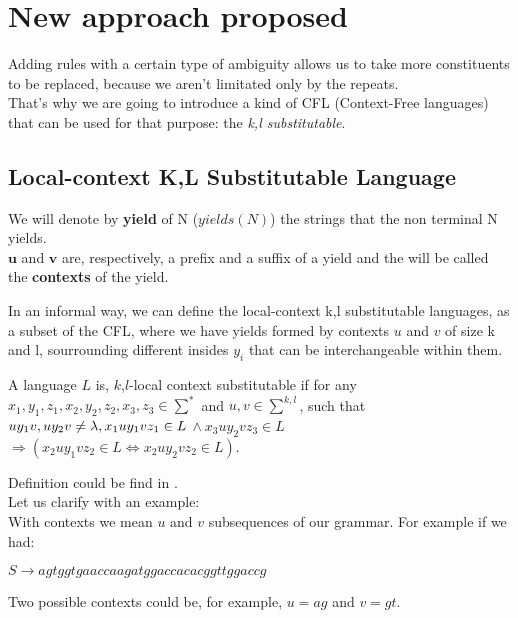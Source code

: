 
	\chapter{New approach proposed}

	Adding rules with a certain type of ambiguity allows us to take more constituents to be replaced, 
	because we aren't limitated only by the repeats. \\

	That's why we are going to introduce
	a kind of CFL (Context-Free languages) that can be used for that purpose: the \emph{k,l substitutable}.\\

	\section{Local-context K,L Substitutable Language}

	We will denote by \textbf{yield} of N ($yields(N)$) the strings that the non terminal
	N yields. \\
	$\bm{u}$ and $\bm{v}$ are, respectively, a prefix and a suffix of a yield and the will be called the \textbf{contexts} of the yield. 

	In an informal way, we can define the local-context k,l substitutable languages, 
	as a subset of the CFL, where we have yields formed
	by contexts $u$ and $v$ of size k and l, sourrounding different insides $y_i$ that can be 
	interchangeable within them.

	A language $L$ is, $k$,$l$-local context substitutable if for any 
	$x_1,y_1,z_1,x_2,y_2,z_2,x_3,z_3 \in \sum^*$ and $u, v \in \sum^{k,l}$, 
	such that \\
	 $uy_1v, uy_2v \neq \lambda, \\
	 x_1uy_1vz_1 \in L$ $\wedge\ x_3uy_2vz_3 \in L$	$\Rightarrow (x_2uy_1vz_2 \in L \Leftrightarrow x_2uy_2vz_2 \in L)$.

	Definition could be find in \cite[p. 3-4]{KL}. \\

	Let us clarify with an example: \\

	With contexts we mean $u$ and $v$ subsequences of our grammar.
	For example if we had:\\
	\begin{center}
	$S \rightarrow agtggtgaaccaagatggaccacacggttggaccg$
	\end{center}

	Two possible contexts could be, for example, $u = ag$ and $v = gt$.

